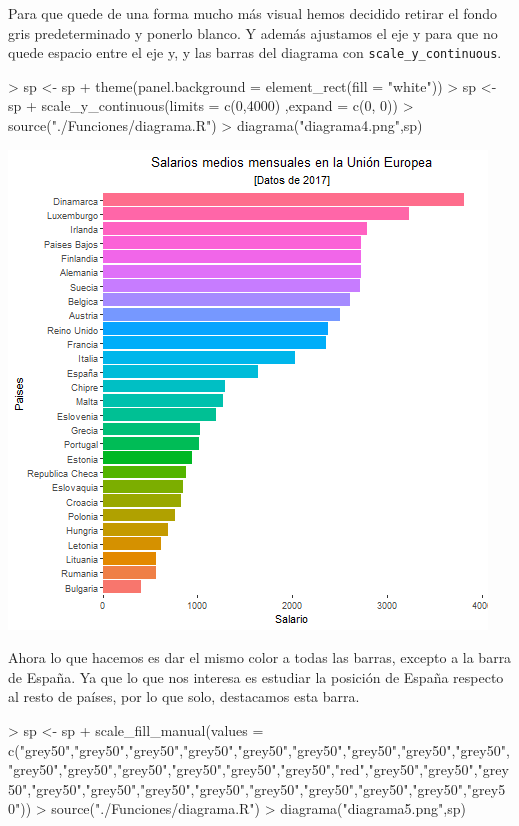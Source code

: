 \documentclass [a4paper] {article}
\begin{document}
\bigskip
Para que quede de una forma mucho más visual hemos decidido retirar el fondo gris predeterminado y ponerlo blanco.
Y además ajustamos el eje y para que no quede espacio entre el eje y, y las barras del diagrama con
\texttt{scale\_y\_continuous}.
\begin{Schunk}
\begin{Sinput}
> sp <- sp + theme(panel.background = element_rect(fill = "white"))
> sp <- sp + scale_y_continuous(limits = c(0,4000) ,expand = c(0, 0))
> source("./Funciones/diagrama.R")
> diagrama("diagrama4.png",sp)
\end{Sinput}
\end{Schunk}

\includegraphics[width=\textwidth]{diagrama4}

\bigskip
Ahora lo que hacemos es dar el mismo color a todas las barras, excepto a la barra de España. Ya que lo que nos interesa
es estudiar la posición de España respecto al resto de países, por lo que solo, destacamos esta barra.
\begin{Schunk}
\begin{Sinput}
> sp <- sp + scale_fill_manual(values = c("grey50","grey50","grey50","grey50","grey50","grey50","grey50","grey50","grey50","grey50","grey50","grey50","grey50","grey50","grey50","red","grey50","grey50","grey50","grey50","grey50","grey50","grey50","grey50","grey50","grey50","grey50","grey50"))
> source("./Funciones/diagrama.R")
> diagrama("diagrama5.png",sp)
\end{Sinput}
\end{Schunk}
\end{document}
